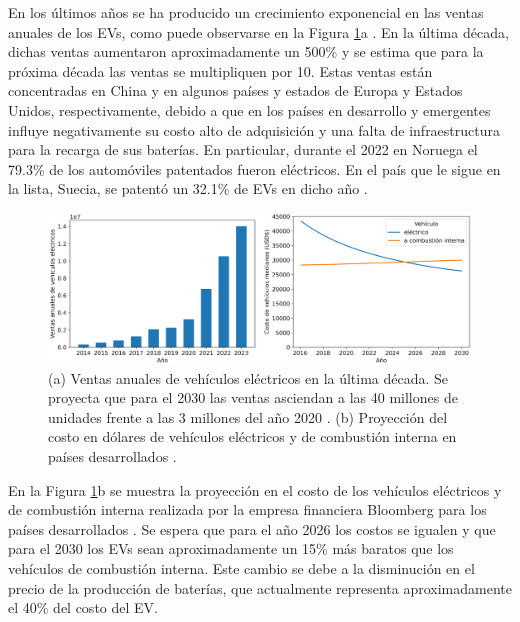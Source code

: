 En los últimos años se ha producido un crecimiento exponencial en las ventas 
anuales de los EVs, como puede observarse en la Figura \ref{fig:evs}a \cite{EVV}. En la
última década, dichas ventas aumentaron aproximadamente un 500\% y se estima que
para la próxima década las ventas se multipliquen por 10. Estas ventas están 
concentradas en China y en algunos países y estados de Europa y Estados Unidos, 
respectivamente, debido a que en los países en desarrollo y emergentes influye 
negativamente su costo alto de adquisición y una falta de infraestructura para la 
recarga de sus baterías. En particular, durante el 2022 en Noruega el 79.3\% de 
los automóviles patentados fueron eléctricos. En el país que le sigue en la lista,
Suecia, se patentó un 32.1\% de EVs en dicho año \cite{PWC}.
\begin{figure}[h!]
    \centering
    \includegraphics[width=\textwidth]{Introduccion/energia/evs.png}
    \caption{(a) Ventas anuales de vehículos eléctricos en la última década. Se 
    proyecta que para el 2030 las ventas asciendan a las 40 millones de unidades 
    frente a las 3 millones del año 2020 \cite{EVV}. (b) Proyección del costo en 
    dólares de vehículos eléctricos y de combustión interna en países 
    desarrollados \cite{BLOOMBERG}.}
    \label{fig:evs}
\end{figure}

En la Figura \ref{fig:evs}b se muestra la proyección en el costo de los vehículos 
eléctricos y de combustión interna realizada por la empresa financiera Bloomberg 
para los países desarrollados \cite{BLOOMBERG}. Se espera que para el año 2026 
los costos se igualen y que para el 2030 los EVs sean aproximadamente un 15\% más
baratos que los vehículos de combustión interna. Este cambio se debe a la 
disminución en el precio de la producción de baterías, que actualmente representa
aproximadamente el 40\% del costo del EV.

